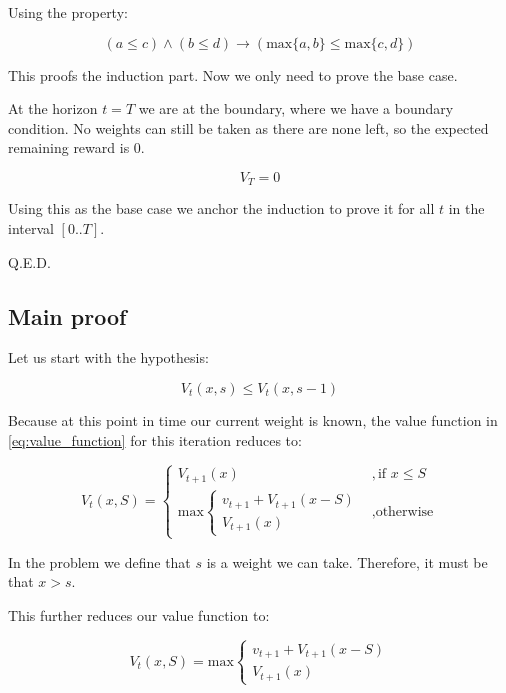 \documentclass[nonacm,sigconf]{acmart}
\begin{document}
Using the property:

\begin{equation}\label{eq:maxpansion}
    \left(a \leq c\right) \wedge \left(b \leq d\right) \rightarrow (\text{max}\{a,
    b\} \leq \text{max}\{c, d\})
\end{equation}

This proofs the induction part. Now we only need to prove the base case.

At the horizon $t = T$ we are at the boundary, where we have a boundary condition.
No weights can still be taken as there are none left, so the expected remaining
reward is $0$.

\begin{equation}
    V_T = 0
\end{equation}

Using this as the base case we anchor the induction to prove it for all $t$ in
the interval $[0..T]$.

Q.E.D.

\subsection{Main proof}

Let us start with the hypothesis:

\begin{equation}\label{eq:hypothesis}
    V_t(x, s) \leq V_t(x, s-1)
\end{equation}

Because at this point in time our current weight is known, the value function in
\cref{eq:value_function} for this iteration reduces to:

\begin{equation}
    V_t(x, S) = \begin{cases}
        V_{t+1}(x) &, \text{if } x \le S \\
        \text{max}\begin{cases}
            v_{t+1}+V_{t+1}(x-S) \\
            V_{t+1}(x)
        \end{cases}
        &, \text{otherwise}
    \end{cases}
\end{equation}

In the problem we define that $s$ is a weight we can take. Therefore, it must be
that $x > s$.

This further reduces our value function to:

\begin{equation}
    V_t(x, S) = \text{max}\begin{cases}
        v_{t+1} + V_{t+1}(x-S) \\
        V_{t+1}(x)
    \end{cases}
\end{equation}
\end{document}
